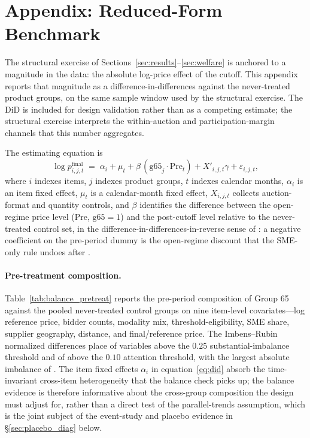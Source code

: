 \section{Appendix: Reduced-Form Benchmark}\label{app:did}

The structural exercise of Sections~\ref{sec:results}--\ref{sec:welfare} is anchored to a magnitude in the data: the absolute log-price effect of the \policyCutoffMonth{} cutoff. This appendix reports that magnitude as a difference-in-differences against the \controlGroupCount{} never-treated product groups, on the same sample window used by the structural exercise. The DiD is included for design validation rather than as a competing estimate; the structural exercise interprets the within-auction and participation-margin channels that this number aggregates.

The estimating equation is
\begin{equation}\label{eq:did}
\log p^{\mathrm{final}}_{i,j,t} \;=\; \alpha_i + \mu_t + \beta \, (\mathrm{g65}_j \cdot \text{Pre}_t) + X'_{i,j,t} \gamma + \varepsilon_{i,j,t},
\end{equation}
where $i$ indexes items, $j$ indexes product groups, $t$ indexes calendar months, $\alpha_i$ is an item fixed effect, $\mu_t$ is a calendar-month fixed effect, $X_{i,j,t}$ collects auction-format and quantity controls, and $\beta$ identifies the difference between the open-regime price level (Pre, $\mathrm{g65}=1$) and the post-cutoff level relative to the never-treated control set, in the difference-in-differences-in-reverse sense of \citet{kim2019}: a negative coefficient on the pre-period dummy is the open-regime discount that the SME-only rule undoes after \policyCutoffMonth.

\paragraph{Pre-treatment composition.} Table~\ref{tab:balance_pretreat} reports the pre-period composition of Group 65 against the pooled \controlGroupCount{} never-treated control groups on nine item-level covariates---log reference price, bidder counts, modality mix, threshold-eligibility, SME share, supplier geography, distance, and final/reference price. The Imbens--Rubin normalized differences \citep{imbens2015} place \balanceNVarsAboveTwentyFive{} of \balanceNVarsTotal{} variables above the $0.25$ substantial-imbalance threshold and \balanceNVarsAboveTen{} of \balanceNVarsTotal{} above the $0.10$ attention threshold, with the largest absolute imbalance of \balanceMaxStdDiff. The item fixed effects $\alpha_i$ in equation~\eqref{eq:did} absorb the time-invariant cross-item heterogeneity that the balance check picks up; the balance evidence is therefore informative about the cross-group composition the design must adjust for, rather than a direct test of the parallel-trends assumption, which is the joint subject of the event-study and placebo evidence in \S\ref{sec:placebo_diag} below.

